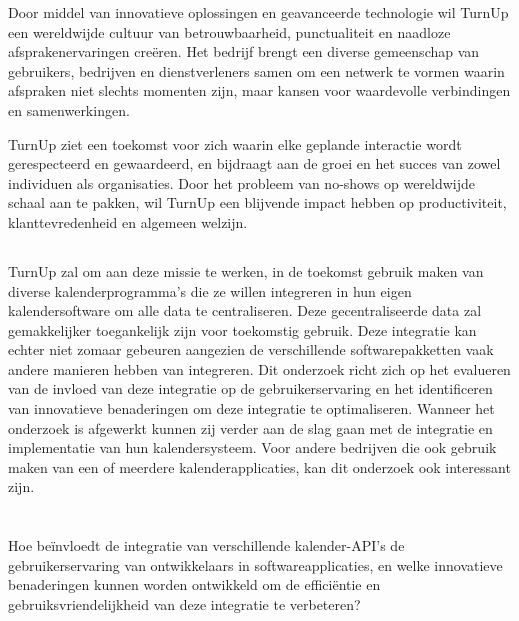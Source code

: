 Door middel van innovatieve oplossingen en geavanceerde technologie wil TurnUp een wereldwijde cultuur van betrouwbaarheid, punctualiteit en naadloze afsprakenervaringen creëren. Het bedrijf brengt een diverse gemeenschap van gebruikers, bedrijven en dienstverleners samen om een netwerk te vormen waarin afspraken niet slechts momenten zijn, maar kansen voor waardevolle verbindingen en samenwerkingen.

TurnUp ziet een toekomst voor zich waarin elke geplande interactie wordt gerespecteerd en gewaardeerd, en bijdraagt aan de groei en het succes van zowel individuen als organisaties. Door het probleem van no-shows op wereldwijde schaal aan te pakken, wil TurnUp een blijvende impact hebben op productiviteit, klanttevredenheid en algemeen welzijn.

\subsection{}
TurnUp zal om aan deze missie te werken, in de toekomst gebruik maken van diverse kalenderprogramma's die ze willen integreren in hun eigen kalendersoftware om alle data te centraliseren. Deze gecentraliseerde data zal gemakkelijker toegankelijk zijn voor toekomstig gebruik. Deze integratie kan echter niet zomaar gebeuren aangezien de verschillende softwarepakketten vaak andere manieren hebben van integreren. Dit onderzoek richt zich op het evalueren van de invloed van deze integratie op de gebruikerservaring en het identificeren van innovatieve benaderingen om deze integratie te optimaliseren.
Wanneer het onderzoek is afgewerkt kunnen zij verder aan de slag gaan met de integratie en implementatie van hun kalendersysteem.
Voor andere bedrijven die ook gebruik maken van een of meerdere kalenderapplicaties, kan dit onderzoek ook interessant zijn.

\section{}%
\label{sec:onderzoeksvraag}

Hoe beïnvloedt de integratie van verschillende kalender-API's de gebruikerservaring van ontwikkelaars in softwareapplicaties, en welke innovatieve benaderingen kunnen worden ontwikkeld om de efficiëntie en gebruiksvriendelijkheid van deze integratie te verbeteren?

\section{}%
\label{sec:onderzoeksdoelstelling}

